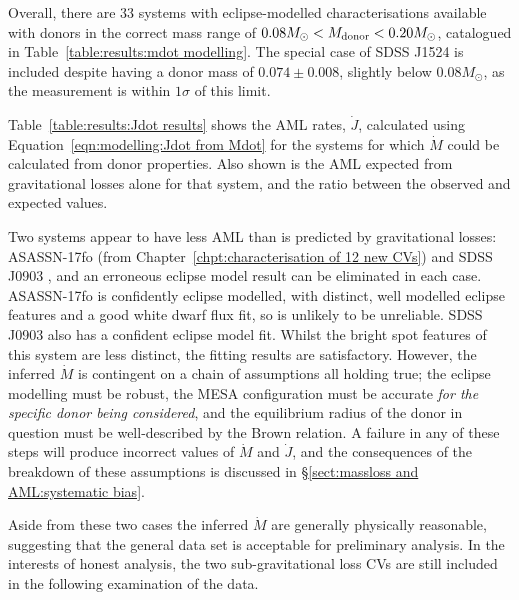 Overall, there are 33 systems with eclipse-modelled characterisations available with donors in the correct mass range of $0.08 M_\odot < M_{\rm donor} < 0.20 M_\odot$, catalogued in Table~\ref{table:results:mdot modelling}.
The special case of SDSS J1524 is included despite having a donor mass of $0.074\pm0.008$, slightly below $0.08 M_\odot$, as the measurement is within $1\sigma$ of this limit.

Table~\ref{table:results:Jdot results} shows the AML rates, $\dot J$, calculated using Equation~\ref{eqn:modelling:Jdot from Mdot} for the systems for which $\dot M$ could be calculated from donor properties. Also shown is the AML expected from gravitational losses alone for that system, and the ratio between the observed and expected values.

Two systems appear to have less AML than is predicted by gravitational losses: ASASSN-17fo (from Chapter~\ref{chpt:characterisation of 12 new CVs}) and SDSS J0903 \citep{Savoury2011}, and an erroneous eclipse model result can be eliminated in each case.
ASASSN-17fo is confidently eclipse modelled, with distinct, well modelled eclipse features and a good white dwarf flux fit, so is unlikely to be unreliable. SDSS J0903 also has a confident eclipse model fit. Whilst the bright spot features of this system are less distinct, the fitting results are satisfactory.
However, the inferred $\dot M$ is contingent on a chain of assumptions all holding true; the eclipse modelling must be robust, the MESA configuration must be accurate \textit{for the specific donor being considered}, and the equilibrium radius of the donor in question must be well-described by the Brown relation. A failure in any of these steps will produce incorrect values of $\dot M$ and $\dot J$, and the consequences of the breakdown of these assumptions is discussed in \S\ref{sect:massloss and AML:systematic bias}.

Aside from these two cases the inferred $\dot M$ are generally physically reasonable, suggesting that the general data set is acceptable for preliminary analysis. In the interests of honest analysis, the two sub-gravitational loss CVs are still included in the following examination of the data.


